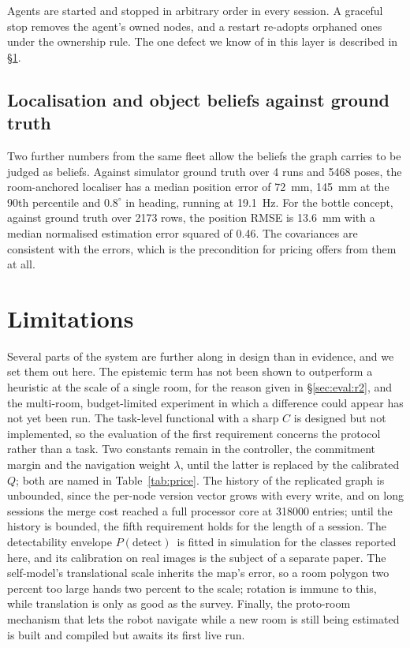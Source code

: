 \documentclass[10pt,twocolumn]{IEEEtran}
\newcommand{\pdet}{\ensuremath{P(\mathrm{detect})}}
\begin{document}
Agents are started and stopped in arbitrary order in every session. A graceful stop removes the
agent's owned nodes, and a restart re-adopts orphaned ones under the ownership rule. The one defect
we know of in this layer is described in \S\ref{sec:limits}.

\subsection{Localisation and object beliefs against ground truth}

Two further numbers from the same fleet allow the beliefs the graph carries to be judged as beliefs.
Against simulator ground truth over 4 runs and \num{5468} poses, the room-anchored localiser has a
median position error of \SI{72}{mm}, \SI{145}{mm} at the 90th percentile and $0.8^\circ$ in
heading, running at \SI{19.1}{Hz}. For the bottle concept, against ground truth over \num{2173}
rows, the position RMSE is \SI{13.6}{mm} with a median normalised estimation error squared of
\num{0.46}. The covariances are consistent with the errors, which is the precondition for pricing
offers from them at all.

\section{Limitations}\label{sec:limits}

Several parts of the system are further along in design than in evidence, and we set them out here.
The epistemic term has not been shown to outperform a heuristic at the scale of a single room, for
the reason given in \S\ref{sec:eval:r2}, and the multi-room, budget-limited experiment in which a
difference could appear has not yet been run. The task-level functional with a sharp $C$ is designed
but not implemented, so the evaluation of the first requirement concerns the protocol rather than a
task. Two constants remain in the controller, the commitment margin and the navigation weight
$\lambda$, until the latter is replaced by the calibrated $Q$; both are named in
Table~\ref{tab:price}. The history of the replicated graph is unbounded, since the per-node version
vector grows with every write, and on long sessions the merge cost reached a full processor core at
\num{318000} entries; until the history is bounded, the fifth requirement holds for the length of a
session. The detectability envelope \pdet\ is fitted in simulation for the classes reported here, and
its calibration on real images is the subject of a separate paper. The self-model's translational
scale inherits the map's error, so a room polygon two percent too large hands two percent to the
scale; rotation is immune to this, while translation is only as good as the survey. Finally, the
proto-room mechanism that lets the robot navigate while a new room is still being estimated is built
and compiled but awaits its first live run.
\end{document}
